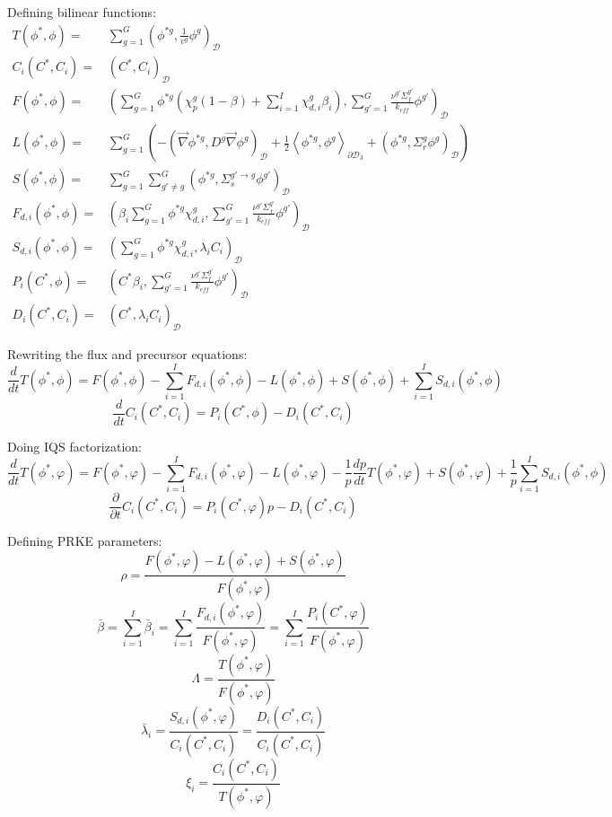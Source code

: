 \documentclass[11pt]{tamurmemo}
\newcommand{\grad}{\vec{\nabla}}
\newcommand{\be}{\begin{equation}}
\newcommand{\ee}{\end{equation}}
\newcommand{\kef}{\ensuremath{k_{\textit{eff}}}}
\newcommand{\keff}{\kef\xspace}
\newcommand{\D}{\ensuremath{\mathcal{D}}}
\begin{document}
Defining bilinear functions:
\begin{align}
T(\phi^{*},\phi) =& \sum_{g=1}^G\left(\phi^{*g},\frac{1}{v^g}\phi^g\right)_\D \\
C_i(C^*,C_i) =& \left(C^*,C_i\right)_\D \\
F(\phi^{*},\phi) =& \left(\sum_{g=1}^G\phi^{*g}\left(\chi_p^g(1-\beta)+\sum_{i=1}^I\chi_{d,i}^g\beta_i\right),\sum_{g'=1}^G \frac{\nu^{g'} \Sigma_f^{g'}}{\keff} \phi^{g'}\right)_\D \\
L(\phi^{*},\phi) =& \sum_{g=1}^G\left(-\left(\grad \phi^{*g},D^g \grad \phi^g\right)_\D + \frac{1}{2}\left\langle\phi^{*g},\phi^{g}\right\rangle_{\partial \D_3} + \left(\phi^{*g},\Sigma_r^g\phi^g\right)_\D \right) \\
S(\phi^{*},\phi) =& \sum_{g=1}^G\sum_{g'\neq g}^G\left(\phi^{*g},\Sigma_s^{g'\to g} \phi^{g'}\right)_\D \\
F_{d,i}(\phi^*,\phi) =& \left(\beta_i\sum_{g=1}^G\phi^{*g} \chi_{d,i}^g,\sum_{g'=1}^G\frac{\nu^{g'} \Sigma_f^{g'}}{\keff}\phi^{g'}\right)_\D \\
S_{d,i}(\phi^*,\phi) =& \left(\sum_{g=1}^G\phi^{*g} \chi_{d,i}^g,\lambda_i C_i\right)_\D \\
P_i(C^*,\phi) =& \left(C^*\beta_i,\sum_{g'=1}^G\frac{\nu^{g'} \Sigma_f^{g'}}{\keff}\phi^{g'}\right)_\D \\
D_i(C^*,C_i) =& \left(C^*,\lambda_i C_i\right)_\D
\end{align}

Rewriting the flux and precursor equations:
\be
\frac{d}{dt} T(\phi^{*},\phi) = F(\phi^{*},\phi) - \sum_{i=1}^I F_{d,i}(\phi^*,\phi) - L(\phi^{*},\phi) + S(\phi^{*},\phi) + \sum_{i=1}^I S_{d,i}(\phi^*,\phi)
\ee
\be
\frac{d}{dt} C_i(C^*,C_i) = P_i(C^*,\phi) - D_i(C^*,C_i)
\ee

Doing IQS factorization:
\be
\frac{d}{dt} T(\phi^{*},\varphi) = F(\phi^{*},\varphi) - \sum_{i=1}^I F_{d,i}(\phi^*,\varphi) - L(\phi^{*},\varphi) - \frac{1}{p}\frac{dp}{dt}T(\phi^{*},\varphi) + S(\phi^{*},\varphi) + \frac{1}{p}\sum_{i=1}^I S_{d,i}(\phi^*,\phi)
\ee
\be
\frac{\partial}{\partial t} C_i(C^*,C_i) = P_i(C^*,\varphi)p - D_i(C^*,C_i)
\ee

Defining PRKE parameters:
\be
\rho = \frac{F(\phi^{*},\varphi) - L(\phi^{*},\varphi) + S(\phi^{*},\varphi)}{F(\phi^{*},\varphi)}
\ee
\be
\bar{\beta} = \sum_{i=1}^I\bar{\beta}_i = \sum_{i=1}^I\frac{F_{d,i}(\phi^*,\varphi)}{F(\phi^{*},\varphi)} = \sum_{i=1}^I\frac{P_i(C^*,\varphi)}{F(\phi^{*},\varphi)}
\ee
\be
\Lambda = \frac{T(\phi^{*},\varphi)}{F(\phi^{*},\varphi)}
\ee
\be
\bar{\lambda}_i = \frac{S_{d,i}(\phi^*,\varphi)}{C_i(C^*,C_i)} = \frac{D_i(C^*,C_i)}{C_i(C^*,C_i)}
\ee
\be
\xi_i = \frac{C_i(C^*,C_i)}{T(\phi^{*},\varphi)}
\ee
\end{document}

